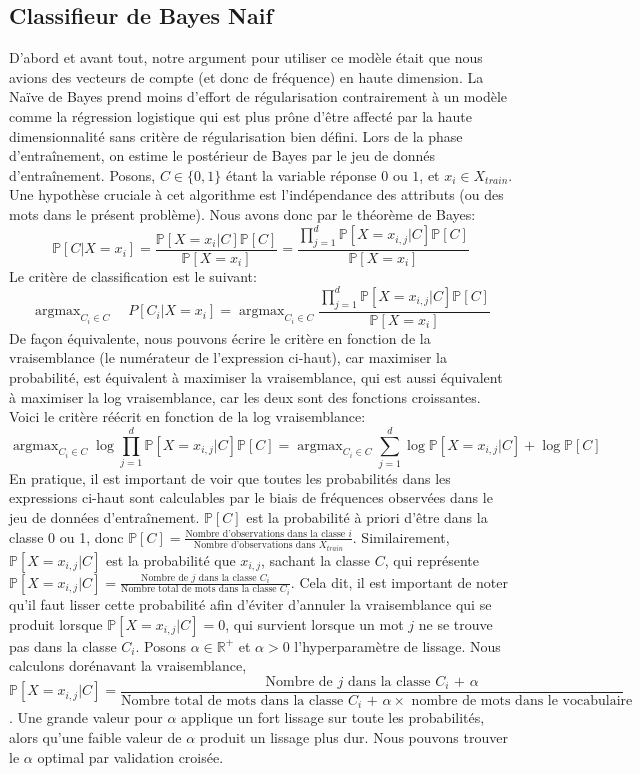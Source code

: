 \documentclass{article}
\DeclareMathOperator*{\argmax}{argmax}
\begin{document}
\subsection{Classifieur de Bayes Naif}
D'abord et avant tout, notre argument pour utiliser ce modèle était que nous avions des vecteurs de compte (et donc de fréquence) en haute dimension. La Naïve de Bayes prend moins d'effort de régularisation contrairement à un modèle comme la régression logistique qui est plus prône d'être affecté par la haute dimensionnalité sans critère de régularisation bien défini.
Lors de la phase d'entraînement, on estime le postérieur de Bayes par le jeu de donnés d'entraînement. Posons, $C \in \{0, 1\}$ étant la variable réponse $0$ ou $1$, et $x_i \in X_{train}$. Une hypothèse cruciale à cet algorithme est l'indépendance des attributs (ou des mots dans le présent problème). Nous avons donc par le théorème de Bayes:\\
$$\mathbb{P}[C | X=x_i] = \frac{\mathbb{P}[X = x_{i}| C]\mathbb{P}[C]}{\mathbb{P}[X = x_i]} =  \frac{\prod_{j = 1}^{d}\mathbb{P}[X = x_{i,j}| C]\mathbb{P}[C]}{\mathbb{P}[X = x_i]}$$
Le critère de classification est le suivant:
$$\argmax_{C_i \in C} \quad P[C_i | X = x_i] = \argmax_{C_i \in C} \frac{\prod_{j = 1}^{d}\mathbb{P}[X = x_{i,j}| C]\mathbb{P}[C]}{\mathbb{P}[X = x_i]}$$
De façon équivalente, nous pouvons écrire le critère en fonction de la vraisemblance (le numérateur de l'expression ci-haut), car maximiser la probabilité, est équivalent à maximiser la vraisemblance, qui est aussi équivalent à maximiser la log vraisemblance, car les deux sont des fonctions croissantes. Voici le critère réécrit en fonction de la log vraisemblance:
$$\argmax_{C_i \in C} \log{\prod_{j = 1}^{d}\mathbb{P}[X = x_{i,j}| C]\mathbb{P}[C]} = \argmax_{C_i \in C} \sum_{j = 1}^{d} \log{\mathbb{P}[X = x_{i,j}| C]} + \log{\mathbb{P}[C]}$$
En pratique, il est important de voir que toutes les probabilités dans les expressions ci-haut sont calculables par le biais de fréquences observées dans le jeu de données d'entraînement. $\mathbb{P}[C]$ est la probabilité à priori d'être dans la classe 0 ou 1, donc $\mathbb{P}[C] = \frac{\text{Nombre d'observations dans la classe $i$}}{\text{Nombre d'observations dans $X_{train}$}}$. Similairement, $\mathbb{P}[X = x_{i, j}| C]$ est la probabilité que $x_{i, j}$, sachant la classe $C$, qui représente $\mathbb{P}[X = x_{i, j}| C] = \frac{\text{Nombre de $j$ dans la classe $C_i$}}{\text{Nombre total de mots dans la classe $C_i$}}$. Cela dit, il est important de noter qu'il faut lisser cette probabilité afin d'éviter d'annuler la vraisemblance qui se produit lorsque $\mathbb{P}[X = x_{i, j}| C] = 0$, qui survient lorsque un mot $j$ ne se trouve pas dans la classe $C_i$. Posons $\alpha \in \mathbb{R}^{+}$ et $\alpha > 0$ l'hyperparamètre de lissage. Nous calculons dorénavant la vraisemblance, $$\mathbb{P}[X = x_{i, j}| C] = \frac{\text{Nombre de $j$ dans la classe $C_i$ + $\alpha$}}{\text{Nombre total de mots dans la classe $C_i$ + $\alpha \times$ nombre de mots dans le vocabulaire}}$$. Une grande valeur pour $\alpha$ applique un fort lissage sur toute les probabilités, alors qu'une faible valeur de $\alpha$ produit un lissage plus dur. Nous pouvons trouver le $\alpha$ optimal par validation croisée. 
\end{document}
